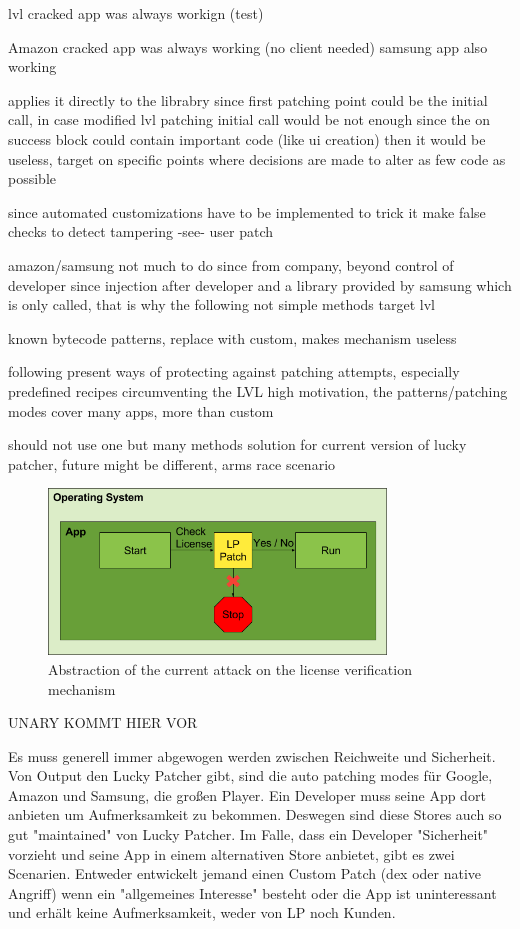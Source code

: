 lvl cracked app was always workign (test)

Amazon cracked app was always working (no client needed)
samsung app also working

applies it directly to the librabry since first patching point could be the initial call, in case modified lvl patching initial call would be not enough since the on success block could contain important code (like ui creation) then it would be useless, target on specific points where decisions are made to alter as few code as possible

since automated customizations have to be implemented to trick it
make false checks to detect tampering -see- user patch

amazon/samsung not much to do since from company, beyond control of developer since injection after developer and a library provided by samsung which is only called, that is why the following not simple methods target lvl

known bytecode patterns, replace with custom, makes mechanism useless

following present ways of protecting against patching attempts, especially predefined recipes circumventing the LVL
high motivation, the patterns/patching modes cover many apps, more than custom

should not use one but many methods
solution for current version of lucky patcher, future might be different, arms race scenario
\cite{munteanLicense}
%

\begin{figure}[h]
    \centering
    \includegraphics[width=0.8\textwidth]{data/verificationNowAttack.png}
    \caption{Abstraction of the current attack on the license verification mechanism}
    \label{fig:verificationNowAttack}
\end{figure}

UNARY KOMMT HIER VOR

Es muss generell immer abgewogen werden zwischen Reichweite und Sicherheit. Von Output den Lucky Patcher gibt, sind die auto patching modes für Google, Amazon und Samsung, die großen Player. Ein Developer muss seine App dort anbieten um Aufmerksamkeit zu bekommen. Deswegen sind diese Stores auch so gut "maintained" von Lucky Patcher.
Im Falle, dass ein Developer "Sicherheit" vorzieht und seine App in einem alternativen Store anbietet, gibt es zwei Scenarien. Entweder entwickelt jemand einen Custom Patch (dex oder native Angriff) wenn ein "allgemeines Interesse" besteht oder die App ist uninteressant und erhält keine Aufmerksamkeit, weder von LP noch Kunden.


